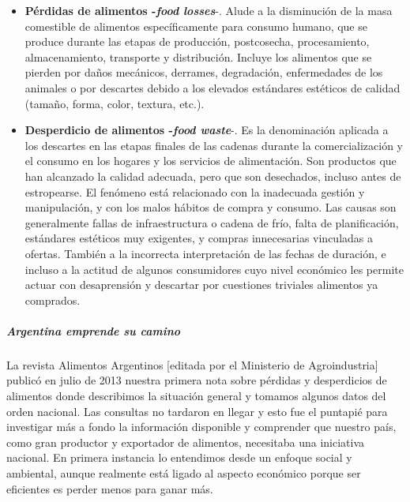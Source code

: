 \documentclass[
]{article}
\begin{document}
\begin{itemize}
\item
  \textbf{Pérdidas de alimentos -\emph{food losses}}-. Alude a la
  disminución de la masa comestible de alimentos específicamente para
  consumo humano, que se produce durante las etapas de producción,
  postcosecha, procesamiento, almacenamiento, transporte y distribución.
  Incluye los alimentos que se pierden por daños mecánicos, derrames,
  degradación, enfermedades de los animales o por descartes debido a los
  elevados estándares estéticos de calidad (tamaño, forma, color,
  textura, etc.).
\item
  \textbf{Desperdicio de alimentos -\emph{food waste}}-. Es la
  denominación aplicada a los descartes en las etapas finales de las
  cadenas durante la comercialización y el consumo en los hogares y los
  servicios de alimentación. Son productos que han alcanzado la calidad
  adecuada, pero que son desechados, incluso antes de estropearse. El
  fenómeno está relacionado con la inadecuada gestión y manipulación, y
  con los malos hábitos de compra y consumo. Las causas son generalmente
  fallas de infraestructura o cadena de frío, falta de planificación,
  estándares estéticos muy exigentes, y compras innecesarias vinculadas
  a ofertas. También a la incorrecta interpretación de las fechas de
  duración, e incluso a la actitud de algunos consumidores cuyo nivel
  económico les permite actuar con desaprensión y descartar por
  cuestiones triviales alimentos ya comprados.
\end{itemize}

\hypertarget{argentina-emprende-su-camino}{%
\subparagraph{Argentina emprende su
camino}\label{argentina-emprende-su-camino}}

La revista Alimentos Argentinos {[}editada por el Ministerio de
Agroindustria{]} publicó en julio de 2013 nuestra primera nota sobre
pérdidas y desperdicios de alimentos donde describimos la situación
general y tomamos algunos datos del orden nacional. Las consultas no
tardaron en llegar y esto fue el puntapié para investigar más a fondo la
información disponible y comprender que nuestro país, como gran
productor y exportador de alimentos, necesitaba una iniciativa nacional.
En primera instancia lo entendimos desde un enfoque social y ambiental,
aunque realmente está ligado al aspecto económico porque ser eficientes
es perder menos para ganar más.
\end{document}
